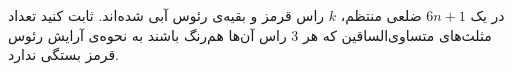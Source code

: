 \EXERCISE
در یک
$6n + 1$
ضلعی منتظم،
$k$
راس قرمز و بقیه‌ی رئوس آبی شده‌اند. ثابت کنید تعداد مثلث‌های متساوی‌الساقین که هر
$3$
راس آن‌ها هم‌رنگ باشند به نحوه‌ی آرایش رئوس قرمز بستگی ندارد.